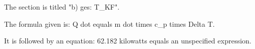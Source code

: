 The section is titled "b) ges: T_KF".

The formula given is:
Q dot equals m dot times c_p times Delta T.

It is followed by an equation:
62.182 kilowatts equals an unspecified expression.